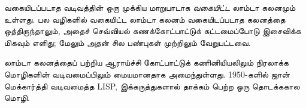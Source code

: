 \documentclass[../../../include/open-logic-section]{subfiles}
\begin{document}
\begin{digress}
வகையிடப்படாத வடிவத்தின் ஒரு முக்கிய மாறுபாடாக \emph{வகையிட்ட} லாம்டா கலனமும்
உள்ளது. பல வழிகளில் வகையிட்ட லாம்டா கலனம் வகையிடப்படாத கலனத்தை ஒத்திருந்தாலும்,
அதைச் செவ்வியல் கணக்கோட்பாட்டுக் கட்டமைப்போடு இசைவிக்க மிகவும் எளிது; மேலும்
அதன் சில பண்புகள் முற்றிலும் வேறுபட்டவை.

லாம்டா கலனத்தைப் பற்றிய ஆராய்ச்சி கோட்பாட்டுக் கணினியியலிலும் நிரலாக்க
மொழிகளின் வடிவமைப்பிலும் மையமானதாக அமைந்துள்ளது. 1950-களில் ஜான் மெக்கார்த்தி
வடிவமைத்த LISP, இக்கருத்துகளால் தாக்கம் பெற்ற ஒரு தொடக்ககால மொழி.
\end{digress}
\end{document}
